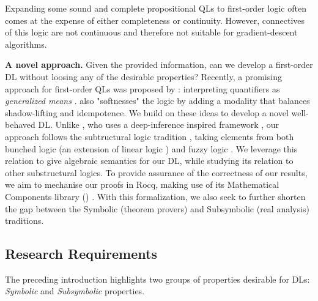 Expanding some sound and complete propositional QLs to first-order logic often comes at the expense of either completeness or continuity.  
However, connectives of this logic are not continuous and therefore not suitable for gradient-descent algorithms.

\textbf{A novel approach.} Given the provided information, can we develop a first-order DL without loosing any of the desirable properties?   Recently, a promising approach for first-order QLs was proposed by \citeauthor{capucci2024quantifiers}: interpreting quantifiers as \textit{generalized means} \citep{capucci2024quantifiers}. \citeauthor{capucci2024quantifiers} also "softnesses" the logic by adding a modality that balances shadow-lifting and idempotence. We build on these ideas to develop a novel well-behaved DL. Unlike \citeauthor{capucci2024quantifiers}, who uses a deep-inference inspired framework \citep{guglielmi2007system, guglielmi2015deep}, our approach follows the subtructural logic tradition \citep{galatos2007residuated}, taking elements from both bunched logic \citep{o1999logic} (an extension of linear logic \citep{agliano2025algebraic}) and fuzzy logic \citep{cintula2011handbook, prooffuzzy}. We leverage this relation to give algebraic semantics for our DL, while studying its relation to other substructural logics. To provide assurance of the correctness of our results, we aim to mechanise our proofs in Rocq, making use of its Mathematical Components library (\mathcomp{}) \cite{mathcomp}. With this formalization, we also seek to further shorten the gap between the Symbolic (theorem provers) and Subsymbolic (real analysis) traditions. 

\subsection{Research Requirements}
The preceding introduction highlights two groups of properties desirable for DLs: \emph{Symbolic} and \emph{Subsymbolic} properties. 

